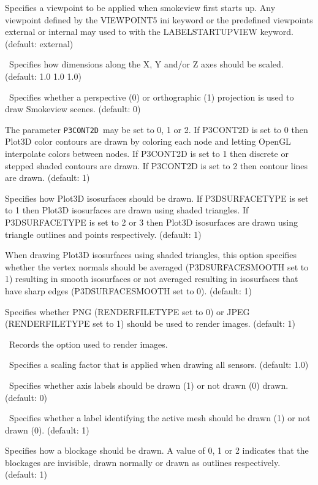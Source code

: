 \documentclass[11pt,twoside]{book}
\newcommand{\hitem}[1]{\item[{\bf #1} \hfill]}
\begin{document}
\hitem{LABELSTARTUPVIEW}Specifies a viewpoint to be applied when smokeview first starts up.
Any viewpoint defined by the VIEWPOINT5 ini keyword or the predefined viewpoints external or internal may used to with the LABELSTARTUPVIEW keyword.
(default: external)

\hitem{MSCALE}\ Specifies how dimensions along the X, Y
and/or Z axes should be scaled. (default: 1.0 1.0 1.0)

\hitem{PROJECTION}\ Specifies whether a perspective (0) or orthographic (1) projection
is used to draw Smokeview scenes.
(default: 0)

\hitem{P3CONT2D}The parameter {\tt P3CONT2D}\ may be set to 0, 1 or
2.  If P3CONT2D is set to 0 then Plot3D color contours are drawn
by coloring each node and letting OpenGL interpolate colors
between nodes.  If P3CONT2D is set to 1 then discrete or stepped
shaded contours are drawn.  If P3CONT2D is set to 2 then contour
lines are drawn. (default: 1)

\hitem{P3DSURFACETYPE}Specifies how Plot3D isosurfaces should be
drawn.  If P3DSURFACETYPE is set to 1 then Plot3D isosurfaces are
drawn using shaded triangles.  If P3DSURFACETYPE is set to 2 or 3
then Plot3D isosurfaces are drawn using triangle outlines and
points respectively. (default: 1)

\hitem{P3DSURFACESMOOTH}When drawing Plot3D isosurfaces using
shaded triangles, this option specifies whether the vertex normals
should be averaged (P3DSURFACESMOOTH set to 1) resulting in smooth
isosurfaces or not averaged resulting in isosurfaces that have
sharp edges (P3DSURFACESMOOTH set to 0). (default: 1)

\hitem{RENDERFILETYPE}Specifies whether PNG (RENDERFILETYPE set to 0) or
JPEG (RENDERFILETYPE set to 1)
should be used to render images.  (default: 1)

\hitem{RENDEROPTION}\ Records the option used to render images.

\hitem{SENSORRELSIZE}\ Specifies a scaling factor that is applied when
drawing all sensors.  (default: 1.0)

\hitem{SHOWAXISLABELS}\ Specifies whether axis labels should
be drawn (1) or not drawn (0) drawn. (default: 0)

\hitem{SHOWBLOCKLABEL}\ Specifies whether a label identifying the
active mesh should be drawn (1) or not drawn (0). (default: 1)

\hitem{SHOWBLOCKS}Specifies how a blockage should
be drawn.  A value of 0, 1 or 2 indicates that the blockages are
invisible, drawn normally or drawn as outlines respectively.  (default: 1)
\end{document}
